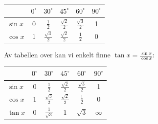 \begin{center}
	\renewcommand{\arraystretch}{1.5}	
	\begin{tabular}{l|c|c|c|c|c}
		& $0^\circ$&$30^\circ$ & $45^\circ$ &$60^\circ$ & $90^\circ$    \\
		\hline
		$\sin x$ & 0 &$\frac{1}{2}$ & $\frac{\sqrt{2}}{2}$ & $\frac{\sqrt{3}}{2}$ & 1 \\
		$\cos x$ & 1 & $\frac{\sqrt{3}}{2}$ & $\frac{\sqrt{2}}{2}$ & $\frac{1}{2}$ & 0 \\
	\end{tabular}
\end{center}
Av tabellen over kan vi enkelt finne $\tan x= \frac{\sin x}{\cos x} $:
\begin{center}
	\renewcommand{\arraystretch}{1.5}	
	\begin{tabular}{l|c|c|c|c|c}
		& $0^\circ$&$30^\circ$ & $45^\circ$ &$60^\circ$ & $90^\circ$    \\
		\hline
		$\sin x$ & 0 &$\frac{1}{2}$ & $\frac{\sqrt{2}}{2}$ & $\frac{\sqrt{3}}{2}$ & 1 \\
		$\cos x$ & 1 & $\frac{\sqrt{3}}{2}$ & $\frac{\sqrt{2}}{2}$ & $\frac{1}{2}$ & 0 \\
		$\tan x$ & 0 &$\frac{1}{\sqrt{3}}$ & $1$ & $\sqrt{3}$ & $ \infty  $
	\end{tabular}
\end{center}


